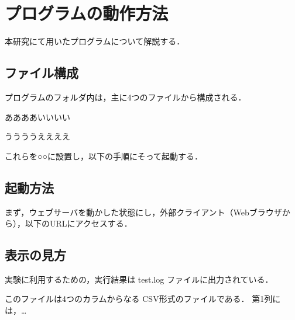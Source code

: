 \chapter{プログラムの動作方法}
本研究にて用いたプログラムについて解説する．

\section{ファイル構成}
プログラムのフォルダ内は，主に4つのファイルから構成される．

ああああいいいい

ううううええええ

これらを○○に設置し，以下の手順にそって起動する．

\section{起動方法}
まず，ウェブサーバを動かした状態にし，外部クライアント（Webブラウザから），以下のURLにアクセスする．


\section{表示の見方}
実験に利用するための，実行結果は test.log ファイルに出力されている．

このファイルは4つのカラムからなる CSV形式のファイルである．
第1列には，…




